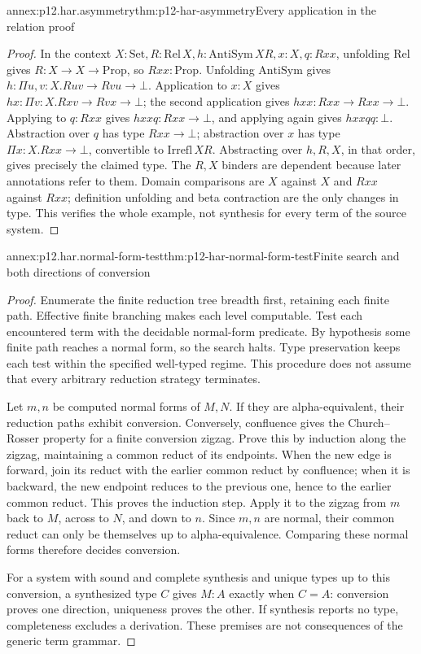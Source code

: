 \begin{annexitem}{annex:p12.har.asymmetry}{thm:p12-har-asymmetry}{Every application in the relation proof}
\begin{proof}
In the context \(X:\mathrm{Set},R:\mathrm{Rel}\,X,
h:\mathrm{AntiSym}\,X R,x:X,q:Rxx\), unfolding \(\mathrm{Rel}\)
gives \(R:X\to X\to\mathrm{Prop}\), so \(Rxx:\mathrm{Prop}\).
Unfolding \(\mathrm{AntiSym}\) gives
\(h:\Pi u,v:X.Ruv\to Rvu\to\bot\). Application to \(x:X\)
gives \(hx:\Pi v:X.Rxv\to Rvx\to\bot\); the second application
gives \(hxx:Rxx\to Rxx\to\bot\). Applying to \(q:Rxx\)
gives \(hxxq:Rxx\to\bot\), and applying again gives
\(hxxqq:\bot\). Abstraction over \(q\) has type
\(Rxx\to\bot\); abstraction over \(x\) has type
\(\Pi x:X.Rxx\to\bot\), convertible to \(\mathrm{Irrefl}\,X R\).
Abstracting over \(h,R,X\), in that order, gives precisely the
claimed type. The \(R,X\) binders are dependent because later
annotations refer to them. Domain comparisons are \(X\) against \(X\)
and \(Rxx\) against \(Rxx\); definition unfolding and beta contraction
are the only changes in type. This verifies the whole example, not
synthesis for every term of the source system.
\end{proof}
\end{annexitem}

\begin{annexitem}{annex:p12.har.normal-form-test}{thm:p12-har-normal-form-test}{Finite search and both directions of conversion}
\begin{proof}
Enumerate the finite reduction tree breadth first, retaining each finite
path. Effective finite branching makes each level computable. Test each
encountered term with the decidable normal-form predicate. By hypothesis
some finite path reaches a normal form, so the search halts. Type
preservation keeps each test within the specified well-typed regime.
This procedure does not assume that every arbitrary reduction strategy
terminates.

Let \(m,n\) be computed normal forms of \(M,N\). If they are
alpha-equivalent, their reduction paths exhibit conversion. Conversely,
confluence gives the Church--Rosser property for a finite conversion
zigzag. Prove this by induction along the zigzag, maintaining a common
reduct of its endpoints. When the new edge is forward, join its reduct
with the earlier common reduct by confluence; when it is backward, the
new endpoint reduces to the previous one, hence to the earlier common
reduct. This proves the induction step. Apply it to the zigzag from
\(m\) back to \(M\), across to \(N\), and down to \(n\).
Since \(m,n\) are normal, their common reduct can only be themselves
up to alpha-equivalence. Comparing these normal forms therefore decides
conversion.

For a system with sound and complete synthesis and unique types up to this
conversion, a synthesized type \(C\) gives \(M:A\) exactly when
\(C=A\): conversion proves one direction, uniqueness proves the other.
If synthesis reports no type, completeness excludes a derivation. These
premises are not consequences of the generic term grammar.
\end{proof}
\end{annexitem}

